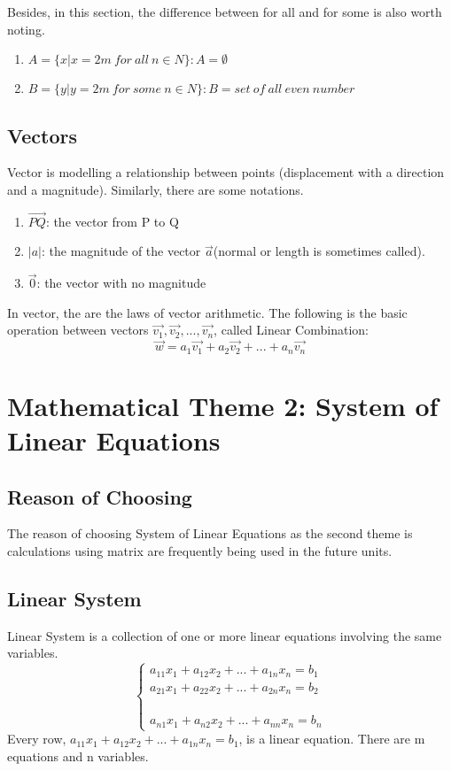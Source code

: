 \documentclass{article}
\begin{document}
\quad Besides, in this section, the difference between for all and for some is also worth noting.
\begin{enumerate}
	\item $A = \{x|x=2m\ for\ all\ n\in N\}: A = \emptyset$
	\item $B = \{y|y=2m\ for\ some\ n\in N\}: B = set\ of\ all\ even\ number$
\end{enumerate}

\subsection{Vectors}
\noindent Vector is modelling a relationship between points (displacement with a direction and a magnitude). Similarly, there are some notations.
\begin{enumerate}
	\item $\overrightarrow{PQ}$: the vector from P to Q
	\item $|a|$: the magnitude of the vector $\overrightarrow{a}$(normal or length is sometimes called).
	\item $\overrightarrow{0}$: the vector with no magnitude
\end{enumerate}

\noindent In vector, the are the laws of vector arithmetic. The following is the basic operation between vectors $\overrightarrow{v_1}, \overrightarrow{v_2}, ..., \overrightarrow{v_n}$, called Linear Combination: $$ \overrightarrow{w} = a_1\overrightarrow{v_1} + a_2\overrightarrow{v_2} + ... + a_n\overrightarrow{v_n}$$

\newpage

\section{Mathematical Theme 2: System of Linear Equations}
\subsection{Reason of Choosing}
\quad The reason of choosing System of Linear Equations as the second theme is calculations using matrix are frequently being used in the future units. 

\subsection{Linear System}
\quad Linear System is a collection of one or more linear equations involving the same variables. $$\left \{ \begin{array}{rcl}
	a_{11} x_1 + a_{12} x_2 + ... + a_{1n} x_n = b_1 \\
	a_{21} x_1 + a_{22} x_2 + ... + a_{2n} x_n = b_2 \\ 
\\
\\
\\
	a_{n1} x_1 + a_{n2} x_2 + ... + a_{nn} x_n = b_n \end{array}\right. $$
Every row, $a_{11} x_1 + a_{12} x_2 + ... + a_{1n} x_n = b_1$, is a linear equation. There are m equations and n variables. 
\end{document}
